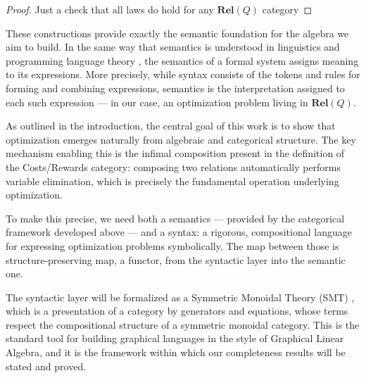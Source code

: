 \begin{proof}
	Just a check that all laws do hold for any $\mathbf{Rel}(Q)$ category
\end{proof}

These constructions provide exactly the semantic foundation for the algebra we aim to build. In the same way that semantics is understood in linguistics and programming language theory \cite{winskel1993formal}, the semantics of a formal system assigns meaning to its expressions. More precisely, while syntax consists of the tokens and rules for forming and combining expressions, semantics is the interpretation assigned to each such expression — in our case, an optimization problem living in $\mathbf{Rel}(Q)$.

As outlined in the introduction, the central goal of this work is to show that optimization emerges naturally from algebraic and categorical structure.
The key mechanism enabling this is the infimal composition present in the definition of the Costs/Rewards category: composing two relations automatically performs variable elimination, which is precisely the fundamental operation underlying optimization.

To make this precise,
we need both a semantics — provided by the categorical framework developed above — and a syntax: a rigorous, compositional language for expressing optimization problems symbolically.
The map between those is structure-preserving map, a functor, from the syntactic layer into the semantic one.

The syntactic layer will be formalized as a Symmetric Monoidal Theory (SMT) \cite{bonchi2017interacting}, which is a presentation of a category by generators and equations, whose terms respect the compositional structure of a symmetric monoidal category. This is the standard tool for building graphical languages in the style of Graphical Linear Algebra, and it is the framework within which our completeness results will be stated and proved.


